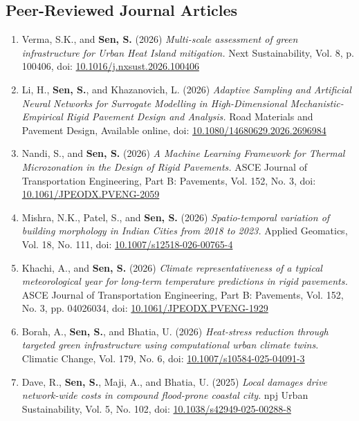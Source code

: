 \documentclass[12pt]{article}
\begin{document}
\subsection*{Peer-Reviewed Journal Articles}
\begin{enumerate}
	\item Verma, S.K., and \textbf{Sen, S.} (2026) \textit{Multi-scale assessment of green infrastructure for Urban Heat Island mitigation.} Next Sustainability, Vol. 8, p. 100406, doi: \href{https://doi.org/10.1016/j.nxsust.2026.100406}{10.1016/j.nxsust.2026.100406} 
	\item Li, H., \textbf{Sen, S.}, and Khazanovich, L. (2026)  \textit{Adaptive Sampling and Artificial Neural Networks for Surrogate Modelling in High-Dimensional Mechanistic-Empirical Rigid Pavement Design and Analysis.} Road Materials and Pavement Design, Available online, doi: \href{https://doi.org/10.1080/14680629.2026.2696984}{10.1080/14680629.2026.2696984} 
	\item Nandi, S., and \textbf{Sen, S.} (2026) \textit{A Machine Learning Framework for Thermal Microzonation in the Design of Rigid Pavements.} ASCE Journal of Transportation Engineering, Part B: Pavements, Vol. 152, No. 3, doi: \href{https://doi.org/10.1061/JPEODX.PVENG-2059}{10.1061/JPEODX.PVENG-2059} 
	\item Mishra, N.K., Patel, S., and \textbf{Sen, S.} (2026) \textit{Spatio-temporal variation of building morphology in Indian Cities from 2018 to 2023.} Applied Geomatics, Vol. 18, No. 111, doi: \href{https://doi.org/10.1007/s12518-026-00765-4}{10.1007/s12518-026-00765-4} 
	\item Khachi, A., and \textbf{Sen, S.} (2026) \textit{Climate representativeness of a typical meteorological year for long-term temperature predictions in rigid pavements.} ASCE Journal of Transportation Engineering, Part B: Pavements, Vol. 152, No. 3, pp. 04026034, doi: \href{https://doi.org/10.1061/JPEODX.PVENG-1929}{10.1061/JPEODX.PVENG-1929} 
	\item Borah, A., \textbf{Sen, S.}, and Bhatia, U. (2026) \textit{Heat-stress reduction through targeted green infrastructure using computational urban climate twins}. Climatic Change, Vol. 179, No. 6, doi: \href{https://doi.org/10.1007/s10584-025-04091-3}{10.1007/s10584-025-04091-3}
	\item Dave, R., \textbf{Sen, S.}, Maji, A., and Bhatia, U. (2025) \textit{Local damages drive network-wide costs in compound flood-prone coastal city}. npj Urban Sustainability, Vol. 5, No. 102, doi: \href{https://doi.org/10.1038/s42949-025-00288-8}{10.1038/s42949-025-00288-8}

\end{enumerate}
\end{document}
